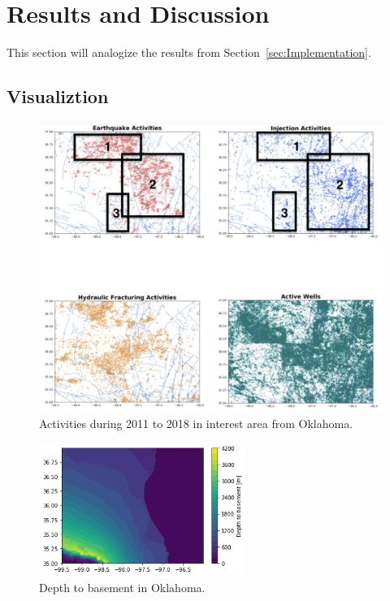 \documentclass[final-report]{report-template}
\begin{document}
\section{Results and Discussion}
This section will analogize the results from Section~\ref{sec:Implementation}.

\subsection{Visualiztion}

\begin{figure}
    \begin{center}
        \includegraphics[width=1\textwidth]{activity.png}
    \end{center}
    \caption{\label{fig:activity} Activities during 2011 to 2018 in interest area from Oklahoma.}
\end{figure}

\begin{figure}
    \begin{center}
        \includegraphics[width=0.6\textwidth]{depth_to_basement.png}
    \end{center}
    \caption{\label{fig:depth_to_basement} Depth to basement in Oklahoma.}
\end{figure}
\end{document}
